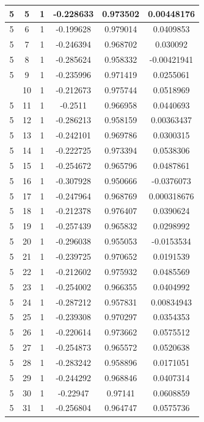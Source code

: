 \documentclass[12pt,a4paper]{article}
\numberwithin{equation}{section}
\numberwithin{figure}{section}
\numberwithin{table}{section}
\begin{document}
\begin{longtable}{|c|c|c|c|c|c|}
5 & 5 & 1 & -0.228633 & 0.973502 & 0.00448176 \\ \hline
5 & 6 & 1 & -0.199628 & 0.979014 & 0.0409853 \\ \hline
5 & 7 & 1 & -0.246394 & 0.968702 & 0.030092 \\ \hline
5 & 8 & 1 & -0.285624 & 0.958332 & -0.00421941 \\ \hline
5 & 9 & 1 & -0.235996 & 0.971419 & 0.0255061 \\ \hline
\pagebreak
5 & 10 & 1 & -0.212673 & 0.975744 & 0.0518969 \\ \hline
5 & 11 & 1 & -0.2511 & 0.966958 & 0.0440693 \\ \hline
5 & 12 & 1 & -0.286213 & 0.958159 & 0.00363437 \\ \hline
5 & 13 & 1 & -0.242101 & 0.969786 & 0.0300315 \\ \hline
5 & 14 & 1 & -0.222725 & 0.973394 & 0.0538306 \\ \hline
5 & 15 & 1 & -0.254672 & 0.965796 & 0.0487861 \\ \hline
5 & 16 & 1 & -0.307928 & 0.950666 & -0.0376073 \\ \hline
5 & 17 & 1 & -0.247964 & 0.968769 & 0.000318676 \\ \hline
5 & 18 & 1 & -0.212378 & 0.976407 & 0.0390624 \\ \hline
5 & 19 & 1 & -0.257439 & 0.965832 & 0.0298992 \\ \hline
5 & 20 & 1 & -0.296038 & 0.955053 & -0.0153534 \\ \hline
5 & 21 & 1 & -0.239725 & 0.970652 & 0.0191539 \\ \hline
5 & 22 & 1 & -0.212602 & 0.975932 & 0.0485569 \\ \hline
5 & 23 & 1 & -0.254002 & 0.966355 & 0.0404992 \\ \hline
5 & 24 & 1 & -0.287212 & 0.957831 & 0.00834943 \\ \hline
5 & 25 & 1 & -0.239308 & 0.970297 & 0.0354353 \\ \hline
5 & 26 & 1 & -0.220614 & 0.973662 & 0.0575512 \\ \hline
5 & 27 & 1 & -0.254873 & 0.965572 & 0.0520638 \\ \hline
5 & 28 & 1 & -0.283242 & 0.958896 & 0.0171051 \\ \hline
5 & 29 & 1 & -0.244292 & 0.968846 & 0.0407314 \\ \hline
5 & 30 & 1 & -0.22947 & 0.97141 & 0.0608859 \\ \hline
5 & 31 & 1 & -0.256804 & 0.964747 & 0.0575736 \\ \hline

\end{longtable}
\end{document}
